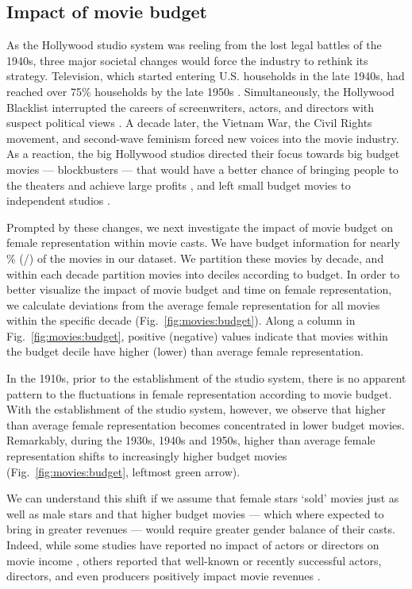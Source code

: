 \subsection{Impact of movie budget}

As the Hollywood studio system was reeling from the lost legal battles of the 1940s, three major societal changes would force the industry to rethink its strategy. Television, which started entering U.S. households in the late 1940s, had reached over 75\% households by the late 1950s \cite{Steinberg1980}. Simultaneously, the Hollywood Blacklist interrupted the careers of screenwriters, actors, and directors with suspect political views \cite{Buhle2004}. A decade later, the Vietnam War, the Civil Rights movement, and second-wave feminism forced new voices into the movie industry. As a reaction, the big Hollywood studios directed their focus towards big budget movies --- blockbusters --- that would have a better chance of bringing people to the theaters and achieve large profits \cite{Garvin1981,Ravid1999}, and left small budget movies to independent studios \cite{Grugulis2012,Faulkner1987}.

Prompted by these changes, we next investigate the impact of movie budget on female representation within movie casts. We have budget information for nearly \budgetCoverage{}\% (\budgetMovies{}/\totalMovies{}) of the movies in our dataset. We partition these movies by decade, and within each decade partition movies into deciles according to budget. In order to better visualize the impact of movie budget and time on female representation, we calculate deviations from the average female representation for all movies within the specific decade (Fig.~\ref{fig:movies:budget}). Along a column in Fig.~\ref{fig:movies:budget}, positive (negative) values indicate that movies within the budget decile have higher (lower) than average female representation.

In the 1910s, prior to the establishment of the studio system, there is no apparent pattern to the fluctuations in female representation according to movie budget. With the establishment of the studio system, however, we observe that higher than average female representation becomes concentrated in lower budget movies. Remarkably, during the 1930s, 1940s and 1950s, higher than average female representation shifts to increasingly higher budget movies (Fig.~\ref{fig:movies:budget}, leftmost green arrow).

We can understand this shift if we assume that female stars `sold' movies just as well as male stars and that higher budget movies --- which where expected to bring in greater revenues --- would require greater gender balance of their casts. Indeed, while some studies have reported no impact of actors or directors on movie income \cite{Ravid1999,Ainslie2005}, others reported that well-known or recently successful actors, directors, and even producers positively impact movie revenues \cite{Elberse2007,Hadida2010}.

